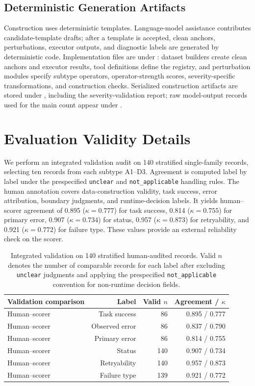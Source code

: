 \documentclass[11pt]{article}
\begin{document}
\subsection{Deterministic Generation Artifacts}

Construction uses deterministic templates. Language-model assistance contributes candidate-template drafts; after a template is accepted, clean anchors, perturbations, executor outputs, and diagnostic labels are generated by deterministic code. Implementation files are under : dataset builders create clean anchors and executor results, tool definitions define the registry, and perturbation modules specify subtype operators, operator-strength scores, severity-specific transformations, and construction checks. Serialized construction artifacts are stored under , including the severity-validation report; raw model-output records used for the main count appear under .

\section{Evaluation Validity Details}
\label{app:validity}

We perform an integrated validation audit on 140 stratified single-family records, selecting ten records from each subtype A1--D3. Agreement is computed label by label under the prespecified \texttt{unclear} and \texttt{not\_applicable} handling rules. The human annotation covers data-construction validity, task success, error attribution, boundary judgments, and runtime-decision labels. It yields human--scorer agreement of 0.895 ($\kappa=0.777$) for task success, 0.814 ($\kappa=0.755$) for primary error, 0.907 ($\kappa=0.734$) for status, 0.957 ($\kappa=0.873$) for retryability, and 0.921 ($\kappa=0.772$) for failure type. These values provide an external reliability check on the scorer.

\begin{table}[htbp]
\centering
\small
\begin{tabular}{lrrr}
\toprule
Validation comparison & Label & Valid $n$ & Agreement / $\kappa$ \\
\midrule
Human--scorer & Task success & 86 & 0.895 / 0.777 \\
Human--scorer & Observed error & 86 & 0.837 / 0.790 \\
Human--scorer & Primary error & 86 & 0.814 / 0.755 \\
Human--scorer & Status & 140 & 0.907 / 0.734 \\
Human--scorer & Retryability & 140 & 0.957 / 0.873 \\
Human--scorer & Failure type & 139 & 0.921 / 0.772 \\
\bottomrule
\end{tabular}
\caption{Integrated validation on 140 stratified human-audited records. Valid $n$ denotes the number of comparable records for each label after excluding \texttt{unclear} judgments and applying the prespecified \texttt{not\_applicable} convention for non-runtime decision fields.}
\label{tab:integrated-validation}
\end{table}
\end{document}
